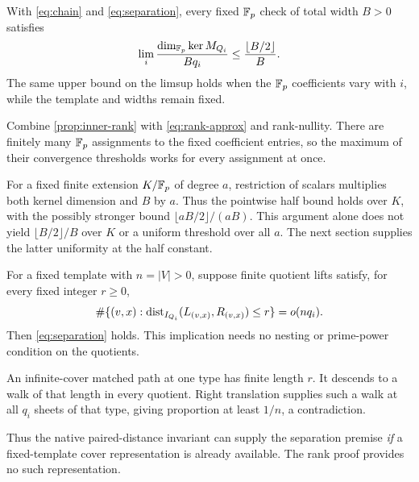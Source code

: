 \begin{theorem}\label{thm:prime-field}
\notformalized
With \eqref{eq:chain} and \eqref{eq:separation}, every fixed
$\mathbb{F}_p$ check of total width $B>0$ satisfies
\[
 \lim_i\frac{\dim_{\mathbb{F}_p}\ker M_{Q_i}}{Bq_i}
       \le\frac{\lfloor B/2\rfloor}{B}.
\]
The same upper bound on the limsup holds when the $\mathbb{F}_p$ coefficients
vary with $i$, while the template and widths remain fixed.
\end{theorem}
\begin{informalproof}
Combine \cref{prop:inner-rank} with \eqref{eq:rank-approx} and
rank-nullity. There are finitely many $\mathbb{F}_p$ assignments to the fixed
coefficient entries, so the maximum of their convergence thresholds
works for every assignment at once.
\end{informalproof}

For a fixed finite extension $K/\mathbb{F}_p$ of degree $a$, restriction of
scalars multiplies both kernel dimension and $B$ by $a$. Thus the
pointwise half bound holds over $K$, with the possibly stronger bound
$\lfloor aB/2\rfloor/(aB)$. This argument alone does not yield
$\lfloor B/2\rfloor/B$ over $K$ or a uniform threshold over all $a$.
The next section supplies the latter uniformity at the half constant.

\begin{lemma}
\label{lem:distance-separation}
\notformalized
For a fixed template with $n=|V|>0$, suppose finite quotient lifts
satisfy, for every fixed integer $r\ge0$,
\[
 \#\{(v,x):\operatorname{dist}_{I_{Q_i}}(L_{(v,x)},R_{(v,x)})\le r\}
       =o(nq_i).
\]
Then \eqref{eq:separation} holds. This implication needs no nesting
or prime-power condition on the quotients.
\end{lemma}
\begin{informalproof}
An infinite-cover matched path at one type has finite length $r$.
It descends to a walk of that length in every quotient. Right
translation supplies such a walk at all $q_i$ sheets of that type,
giving proportion at least $1/n$, a contradiction.
\end{informalproof}

Thus the native paired-distance invariant can supply the separation
premise \emph{if} a fixed-template cover representation is already
available. The rank proof provides no such representation.

